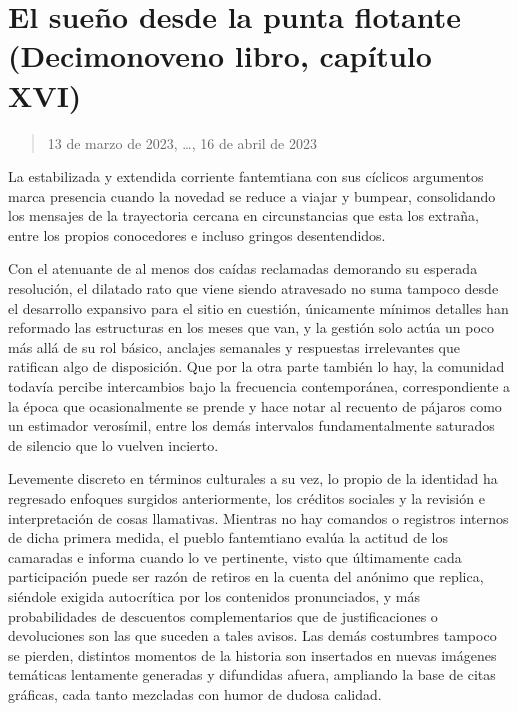 \documentclass[
]{book}
\begin{document}
\hypertarget{el-sueuxf1o-desde-la-punta-flotante-decimonoveno-libro-capuxedtulo-xvi}{%
\section{El sueño desde la punta flotante (Decimonoveno libro, capítulo XVI)}\label{el-sueuxf1o-desde-la-punta-flotante-decimonoveno-libro-capuxedtulo-xvi}}

\begin{quote}
13 de marzo de 2023, \ldots, 16 de abril de 2023
\end{quote}

La estabilizada y extendida corriente fantemtiana con sus cíclicos argumentos marca presencia cuando la novedad se reduce a viajar y bumpear, consolidando los mensajes de la trayectoria cercana en circunstancias que esta los extraña, entre los propios conocedores e incluso gringos desentendidos.

Con el atenuante de al menos dos caídas reclamadas demorando su esperada resolución, el dilatado rato que viene siendo atravesado no suma tampoco desde el desarrollo expansivo para el sitio en cuestión, únicamente mínimos detalles han reformado las estructuras en los meses que van, y la gestión solo actúa un poco más allá de su rol básico, anclajes semanales y respuestas irrelevantes que ratifican algo de disposición. Que por la otra parte también lo hay, la comunidad todavía percibe intercambios bajo la frecuencia contemporánea, correspondiente a la época que ocasionalmente se prende y hace notar al recuento de pájaros como un estimador verosímil, entre los demás intervalos fundamentalmente saturados de silencio que lo vuelven incierto.

Levemente discreto en términos culturales a su vez, lo propio de la identidad ha regresado enfoques surgidos anteriormente, los créditos sociales y la revisión e interpretación de cosas llamativas. Mientras no hay comandos o registros internos de dicha primera medida, el pueblo fantemtiano evalúa la actitud de los camaradas e informa cuando lo ve pertinente, visto que últimamente cada participación puede ser razón de retiros en la cuenta del anónimo que replica, siéndole exigida autocrítica por los contenidos pronunciados, y más probabilidades de descuentos complementarios que de justificaciones o devoluciones son las que suceden a tales avisos. Las demás costumbres tampoco se pierden, distintos momentos de la historia son insertados en nuevas imágenes temáticas lentamente generadas y difundidas afuera, ampliando la base de citas gráficas, cada tanto mezcladas con humor de dudosa calidad.
\end{document}
